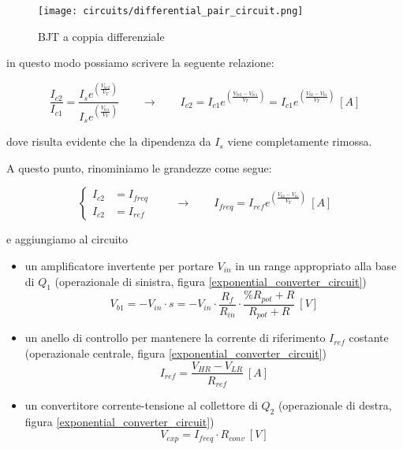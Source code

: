 \begin{figure}[H]
    \centering
    \texttt{[image: circuits/differential\_pair\_circuit.png]}
    \caption{BJT a coppia differenziale}
    \label{differential_pair_circuit}
\end{figure}

in questo modo possiamo scrivere la seguente relazione:

\begin{equation}\label{differential_pair}
    \frac{I_{c2}}{I_{c1}}=\frac{I_s e^{\left(\frac{V_{be2}}{V_T}\right)}}{I_s e^{\left(\frac{V_{be1}}{V_T}\right)}}
    \qquad
    \rightarrow
    \qquad
    I_{c2}=I_{c1}e^{\left(\frac{V_{be2}-V_{be1}}{V_T}\right)}=I_{c1}e^{\left(\frac{V_{b2}-V_{b1}}{V_T}\right)}\ [A]
\end{equation}

dove risulta evidente che la dipendenza da $I_s$ viene completamente rimossa.

A questo punto, rinominiamo le grandezze come segue:

\begin{equation}\label{renamed_differential_pair}
    \left\{ \begin{aligned}
        I_{c2} & = I_{freq} \\
        I_{c2} & = I_{ref}
    \end{aligned} \right.
    \qquad
    \rightarrow
    \qquad
    I_{freq}=I_{ref}e^{\left(\frac{V_{b2}-V_{b1}}{V_T}\right)}\ [A]
\end{equation}

e aggiungiamo al circuito

\begin{itemize}
    \item un amplificatore invertente per portare $V_{in}$ in un range appropriato alla base
          di $Q_1$ (operazionale di sinistra, figura \ref{exponential_converter_circuit})
          \begin{equation}\label{amplifier}
              V_{b1}=-V_{in}\cdot s=
              -V_{in}\cdot\frac{R_f}{R_{in}}\cdot\frac{\%R_{pot}+R}{R_{pot}+R}\ [V]
          \end{equation}
    \item un anello di controllo per mantenere la corrente di riferimento $I_{ref}$ costante
          (operazionale centrale, figura \ref{exponential_converter_circuit})
          \begin{equation}\label{iref}
              I_{ref}=\frac{V_{HR}-V_{LR}}{R_{ref}}\ [A]
          \end{equation}
    \item un convertitore corrente-tensione al collettore di $Q_2$ (operazionale di destra,
          figura \ref{exponential_converter_circuit})
          \begin{equation}\label{ivconv}
              V_{exp}=I_{freq}\cdot R_{conv}\ [V]
          \end{equation}
\end{itemize}

